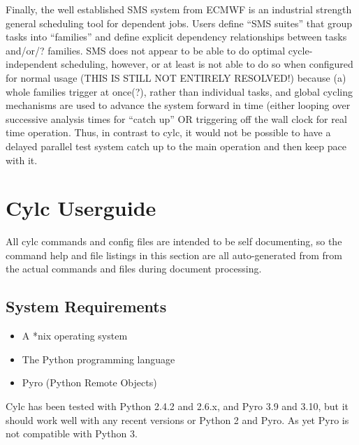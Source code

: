 \documentclass[11pt,a4paper]{article}
\begin{document}
Finally, the well established SMS system from ECMWF is an industrial
strength general scheduling tool for dependent jobs. Users define ``SMS
suites'' that group tasks into ``families'' and define explicit
dependency relationships between tasks and/or/? families. SMS does not
appear to be able to do optimal cycle-independent scheduling, however,
or at least is not able to do so when configured for normal usage (THIS
IS STILL NOT ENTIRELY RESOLVED!) because (a) whole families trigger 
at once(?), rather than individual tasks, and global cycling mechanisms
are used to advance the system forward in time (either looping
over successive analysis times for ``catch up'' OR triggering off the
wall clock for real time operation. Thus, in contrast to cylc, it would
not be possible to have a delayed parallel test system catch up to the
main operation and then keep pace with it.




\pagebreak
\section{Cylc Userguide}
\label{sec:usage}

All cylc commands and config files are intended to be self documenting,
so the command help and file listings in this section are all
auto-generated from from the actual commands and files during document
processing.

\subsection{System Requirements}

\begin{itemize}
    \item A *nix operating system
    \item The Python programming language
    \item Pyro (Python Remote Objects)
\end{itemize}

Cylc has been tested with Python 2.4.2 and 2.6.x, and Pyro 3.9 and 3.10,
but it should work well with any recent versions or Python 2 and Pyro.
As yet Pyro is not compatible with Python 3.
\end{document}
